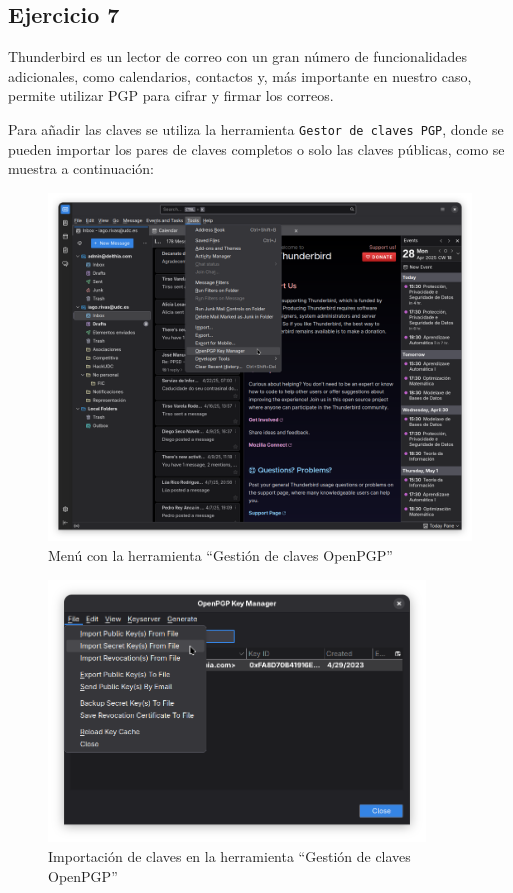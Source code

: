 \subsection{Ejercicio 7}
\graphicspath{ {img/07} }

Thunderbird es un lector de correo con un gran número de funcionalidades adicionales, como calendarios, contactos y, más importante en nuestro caso, permite utilizar PGP para cifrar y firmar los correos.

Para añadir las claves se utiliza la herramienta \texttt{Gestor de claves PGP}, donde se pueden importar los pares de claves completos o solo las claves públicas, como se muestra a continuación:

\begin{figure}[H]
    \centering
    \includegraphics[width=\textwidth]{thunderbird-tools-menu.png}
    \caption{Menú con la herramienta “Gestión de claves OpenPGP”}
\end{figure}

\begin{figure}[H]
    \centering
    \includegraphics[width=10cm]{thunderbird-keymanager.png}
    \caption{Importación de claves en la herramienta “Gestión de claves OpenPGP”}
\end{figure}

